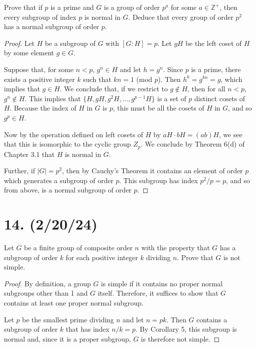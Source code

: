 \documentclass{article}
\begin{document}
Prove that if $p$ is a prime and $G$ is a group of order $p^a$ for some $a \in \mathbb{Z}^+$, then every subgroup of index $p$ is normal in $G$. Deduce that every group of order $p^2$ has a normal subgroup of order $p$.

\begin{proof}
    Let $H$ be a subgroup of $G$ with $[G:H] = p$. Let $gH$ be the left coset of $H$ by some element $g \in G$.
    
    Suppose that, for some $n < p$, $g^n \in H$ and let $h = g^n$. Since $p$ is a prime, there exists a positive integer $k$ such that $kn = 1$ (mod $p$). Then $h^k = g^{kn} = g$, which implies that $g \in H$. We conclude that, if we restrict to $g \notin H$, then for all $n < p$, $g^n \notin H$. This implies that $\{ H, gH, g^2 H, ..., g^{p - 1} H \}$ is a set of $p$ distinct cosets of $H$. Because the index of $H$ in $G$ is $p$, this must be all the cosets of $H$ in $G$, and so $g^p \in H$.

    Now by the operation defined on left cosets of $H$ by $aH \cdot bH = (ab)H$, we see that this is isomorphic to the cyclic group $Z_p$. We conclude by Theorem 6(d) of Chapter 3.1 that $H$ is normal in $G$.

    Further, if $|G| = p^2$, then by Cauchy's Theorem it contains an element of order $p$ which generates a subgroup of order $p$. This subgroup has index $p^2/p = p$, and so from above, is a normal subgroup of order $p$.
\end{proof}

\section*{14. (2/20/24)}

Let $G$ be a finite group of composite order $n$ with the property that $G$ has a subgroup of order $k$ for each positive integer $k$ dividing $n$. Prove that $G$ is not simple.

\begin{proof}
    By definition, a group $G$ is simple if it contains no proper normal subgroups other than 1 and $G$ itself. Therefore, it suffices to show that $G$ contains at least one proper normal subgroup.

    Let $p$ be the smallest prime dividing $n$ and let $n = pk$. Then $G$ contains a subgroup of order $k$ that has index $n/k = p$. By Corollary 5, this subgroup is normal and, since it is a proper subgroup, $G$ is therefore not simple.
\end{proof}
\end{document}
